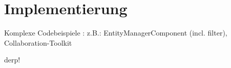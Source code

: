 
\section{Implementierung} \label{sec:implementierung}

Komplexe Codebeispiele : z.B.: EntityManagerComponent (incl. filter), Collaboration-Toolkit

derp!